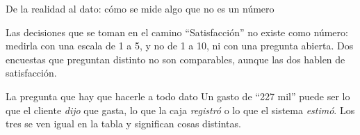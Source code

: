 \documentclass[aspectratio=169,10pt]{beamer}
\begin{document}
\begin{frame}{De la realidad al dato: cómo se mide algo que no es un número}
  \scriptsize
  \begin{center}
  \end{center}

  \vspace{0.15cm}
  \begin{alertblock}{Las decisiones que se toman en el camino}
    \scriptsize
    ``Satisfacción'' no existe como número:  medirla
    con una escala de 1 a 5, y no de 1 a 10, ni con una pregunta abierta.
     Dos encuestas que preguntan
    distinto no son comparables, aunque las dos hablen de satisfacción.
  \end{alertblock}

  \vspace{0.1cm}
  \begin{exampleblock}{La pregunta que hay que hacerle a todo dato}
    \scriptsize
     Un gasto de ``227 mil'' puede ser
    lo que el cliente \emph{dijo} que gasta, lo que la caja \emph{registró} o
    lo que el sistema \emph{estimó}. Los tres se ven igual en la tabla y
    significan cosas distintas.
  \end{exampleblock}
\end{frame}
\end{document}
